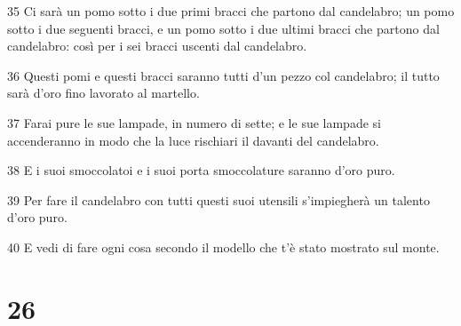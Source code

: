 \par 35 Ci sarà un pomo sotto i due primi bracci che partono dal candelabro; un pomo sotto i due seguenti bracci, e un pomo sotto i due ultimi bracci che partono dal candelabro: così per i sei bracci uscenti dal candelabro.
\par 36 Questi pomi e questi bracci saranno tutti d'un pezzo col candelabro; il tutto sarà d'oro fino lavorato al martello.
\par 37 Farai pure le sue lampade, in numero di sette; e le sue lampade si accenderanno in modo che la luce rischiari il davanti del candelabro.
\par 38 E i suoi smoccolatoi e i suoi porta smoccolature saranno d'oro puro.
\par 39 Per fare il candelabro con tutti questi suoi utensili s'impiegherà un talento d'oro puro.
\par 40 E vedi di fare ogni cosa secondo il modello che t'è stato mostrato sul monte.

\chapter{26}

